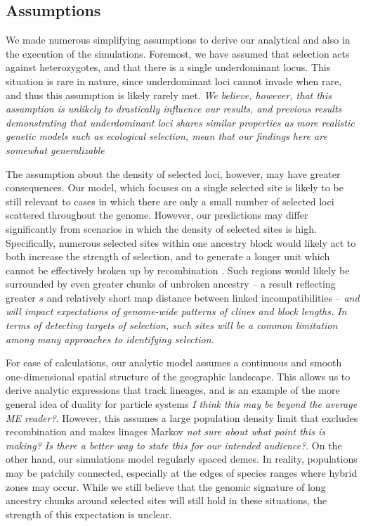 \documentclass[12pt]{article}
\newcommand{\alisa}[1]{{\em \color{red} #1}}
\begin{document}
\subsection*{Assumptions}
We made numerous simplifying assumptions to derive our analytical and also in the execution of the simulations. %
Foremost, we have assumed that selection acts against heterozygotes, and that there is a single underdominant locus. This situation is rare in nature, since underdominant loci cannot invade when rare, and thus this assumption is likely rarely met. \alisa{We believe, however, that this assumption is unlikely to drastically influence our results, and previous results demonstrating that underdominant loci shares similar properties as more realistic genetic models such as ecological selection, mean that our findings here are somewhat generalizable} \citep{Barton1989; Barton1993}

The assumption about the density of selected loci, however, may have greater consequences. Our model, which focuses on a single selected site is likely to be still relevant to cases in which there are only a small number of selected loci scattered throughout the genome. However, our predictions may differ significantly from scenarios in which the density of selected sites is high. Specifically, numerous selected sites within one ancestry block would likely act to both  increase the strength of selection, and to generate a longer unit which cannot be effectively broken up by recombination   \citep{Barton1983; Kruuk1999)}. Such regions would likely be surrounded by even greater chunks of unbroken ancestry -- a result reflecting  greater $s$ and relatively short map distance between linked incompatibilities -- \alisa{and will impact expectations of genome-wide patterns of clines and block lengths. In terms of detecting targets of selection, such sites will be a common limitation among many approaches to identifying selection.}

For ease of calculations, our analytic model assumes a continuous and smooth one-dimensional spatial structure of the geographic landscape. This allows us to derive analytic expressions that track lineages, and is an example of the more general idea of duality for particle systems \alisa{I think this may be beyond the average ME reader?}. However, this assumes a large population density limit that excludes recombination and makes linages Markov \alisa{not sure about what point this is making? Is there a better way to state this for our intended audience?}.  On the other hand, our simulations model regularly spaced demes. In reality, populations may be patchily connected, especially at the edges of species ranges where hybrid zones may occur. While we still believe that the genomic signature of long ancestry chunks around selected sites will still hold in these situations, the strength of this expectation is unclear.\\
\end{document}
